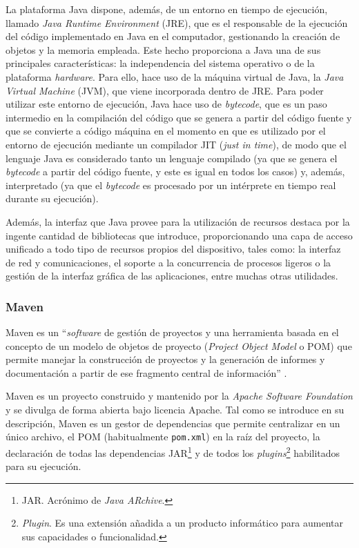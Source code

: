 La plataforma Java dispone, además, de un entorno en tiempo de ejecución, llamado \textit{Java Runtime Environment} (JRE), que es el responsable de la ejecución del código implementado en Java en el computador, gestionando la creación de objetos y la memoria empleada. Este hecho proporciona a Java una de sus principales características: la independencia del sistema operativo o de la plataforma \textit{hardware}. Para ello, hace uso de la máquina virtual de Java, la \textit{Java Virtual Machine} (JVM), que viene incorporada dentro de JRE. Para poder utilizar este entorno de ejecución, Java hace uso de \textit{bytecode}, que es un paso intermedio en la compilación del código que se genera a partir del código fuente y que se convierte a código máquina en el momento en que es utilizado por el entorno de ejecución mediante un compilador JIT (\textit{just in time}), de modo que el lenguaje Java es considerado tanto un lenguaje compilado (ya que se genera el \textit{bytecode} a partir del código fuente, y este es igual en todos los casos) y, además, interpretado (ya que el \textit{bytecode} es procesado por un intérprete en tiempo real durante su ejecución).

Además, la interfaz que Java provee para la utilización de recursos destaca por la ingente cantidad de bibliotecas que introduce, proporcionando una capa de acceso unificado a todo tipo de recursos propios del dispositivo, tales como: la interfaz de red y comunicaciones, el soporte a la concurrencia de procesos ligeros o la gestión de la interfaz gráfica de las aplicaciones, entre muchas otras utilidades.

\subsubsection{Maven}
Maven es un ``\textit{software} de gestión de proyectos y una herramienta basada en el concepto de un modelo de objetos de proyecto (\textit{Project Object Model} o POM) que permite manejar la construcción de proyectos y la generación de informes y documentación a partir de ese fragmento central de información'' \cite{Tec_Maven}.

Maven es un proyecto construido y mantenido por la \textit{Apache Software Foundation} y se divulga de forma abierta bajo licencia Apache. Tal como se introduce en su descripción, Maven es un gestor de dependencias que permite centralizar en un único archivo, el POM (habitualmente \texttt{pom.xml}) en la raíz del proyecto, la declaración de todas las dependencias JAR\footnote{JAR. Acrónimo de \textit{Java ARchive}.} y de todos los \textit{plugins}\footnote{\textit{Plugin}. Es una extensión añadida a un producto informático para aumentar sus capacidades o funcionalidad.} habilitados para su ejecución.

